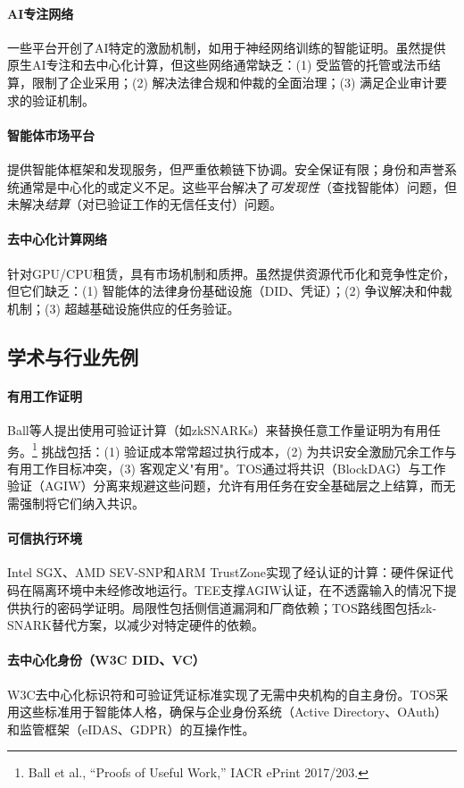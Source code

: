 \documentclass[11pt]{article}
\begin{document}
\paragraph{AI专注网络} 一些平台开创了AI特定的激励机制，如用于神经网络训练的智能证明。虽然提供原生AI专注和去中心化计算，但这些网络通常缺乏：(1) 受监管的托管或法币结算，限制了企业采用；(2) 解决法律合规和仲裁的全面治理；(3) 满足企业审计要求的验证机制。

\paragraph{智能体市场平台} 提供智能体框架和发现服务，但严重依赖链下协调。安全保证有限；身份和声誉系统通常是中心化的或定义不足。这些平台解决了\emph{可发现性}（查找智能体）问题，但未解决\emph{结算}（对已验证工作的无信任支付）问题。

\paragraph{去中心化计算网络} 针对GPU/CPU租赁，具有市场机制和质押。虽然提供资源代币化和竞争性定价，但它们缺乏：(1) 智能体的法律身份基础设施（DID、凭证）；(2) 争议解决和仲裁机制；(3) 超越基础设施供应的任务验证。

\subsection{学术与行业先例}
\paragraph{有用工作证明} Ball等人提出使用可验证计算（如zkSNARKs）来替换任意工作量证明为有用任务。\footnote{Ball et al., ``Proofs of Useful Work,'' IACR ePrint 2017/203.} 挑战包括：(1) 验证成本常常超过执行成本，(2) 为共识安全激励冗余工作与有用工作目标冲突，(3) 客观定义"有用"。TOS通过将共识（BlockDAG）与工作验证（AGIW）分离来规避这些问题，允许有用任务在安全基础层之上结算，而无需强制将它们纳入共识。

\paragraph{可信执行环境} Intel SGX、AMD SEV-SNP和ARM TrustZone实现了经认证的计算：硬件保证代码在隔离环境中未经修改地运行。TEE支撑AGIW认证，在不透露输入的情况下提供执行的密码学证明。局限性包括侧信道漏洞和厂商依赖；TOS路线图包括zk-SNARK替代方案，以减少对特定硬件的依赖。

\paragraph{去中心化身份（W3C DID、VC）} W3C去中心化标识符和可验证凭证标准实现了无需中央机构的自主身份。TOS采用这些标准用于智能体人格，确保与企业身份系统（Active Directory、OAuth）和监管框架（eIDAS、GDPR）的互操作性。
\end{document}
